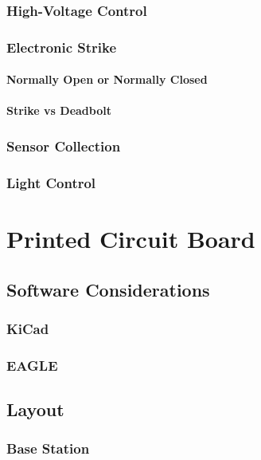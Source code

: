   \subsubsection{High-Voltage Control}
\lipsum[1]
  \subsubsection{Electronic Strike}
\lipsum[1]
   \paragraph{Normally Open or Normally Closed}
\lipsum[1]
   \paragraph{Strike vs Deadbolt}
\lipsum[1]
  \subsubsection{Sensor Collection}
\lipsum[1]
  \subsubsection{Light Control}
\lipsum[1]
\section{Printed Circuit Board}
\lipsum[1]
 \subsection{Software Considerations}
\lipsum[1]
  \subsubsection{KiCad}
\lipsum[1]
  \subsubsection{EAGLE}
\lipsum[1]
 \subsection{Layout}
\lipsum[1]
  \subsubsection{Base Station}
\lipsum[1]

